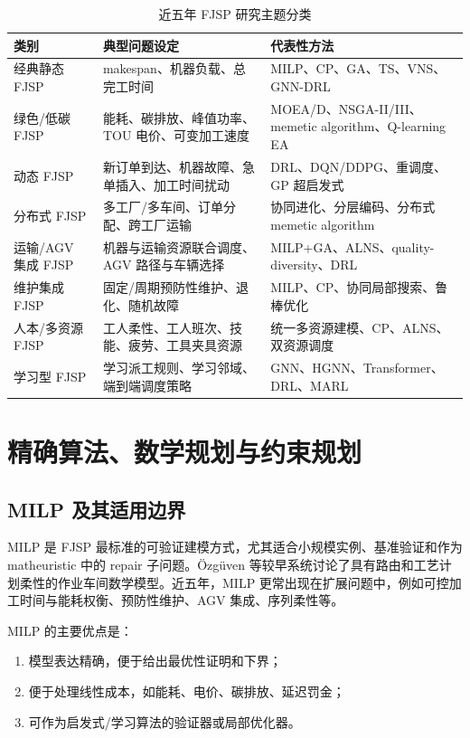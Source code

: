 \documentclass[UTF8,a4paper,11pt]{ctexart}
\begin{document}
\begin{table}[H]
\centering
\caption{近五年 FJSP 研究主题分类}
\label{tab:taxonomy}
\begin{tabularx}{\textwidth}{p{3.0cm}Y Y}
\toprule
类别 & 典型问题设定 & 代表性方法 \\
\midrule
经典静态 FJSP & makespan、机器负载、总完工时间 & MILP、CP、GA、TS、VNS、GNN-DRL \\
绿色/低碳 FJSP & 能耗、碳排放、峰值功率、TOU 电价、可变加工速度 & MOEA/D、NSGA-II/III、memetic algorithm、Q-learning EA \\
动态 FJSP & 新订单到达、机器故障、急单插入、加工时间扰动 & DRL、DQN/DDPG、重调度、GP 超启发式 \\
分布式 FJSP & 多工厂/多车间、订单分配、跨工厂运输 & 协同进化、分层编码、分布式 memetic algorithm \\
运输/AGV 集成 FJSP & 机器与运输资源联合调度、AGV 路径与车辆选择 & MILP+GA、ALNS、quality-diversity、DRL \\
维护集成 FJSP & 固定/周期预防性维护、退化、随机故障 & MILP、CP、协同局部搜索、鲁棒优化 \\
人本/多资源 FJSP & 工人柔性、工人班次、技能、疲劳、工具夹具资源 & 统一多资源建模、CP、ALNS、双资源调度 \\
学习型 FJSP & 学习派工规则、学习邻域、端到端调度策略 & GNN、HGNN、Transformer、DRL、MARL \\
\bottomrule
\end{tabularx}
\end{table}

\section{精确算法、数学规划与约束规划}

\subsection{MILP 及其适用边界}

MILP 是 FJSP 最标准的可验证建模方式，尤其适合小规模实例、基准验证和作为 matheuristic 中的 repair 子问题。Özgüven 等较早系统讨论了具有路由和工艺计划柔性的作业车间数学模型\cite{Ozgüven2010}。近五年，MILP 更常出现在扩展问题中，例如可控加工时间与能耗权衡\cite{Meng2023CPT}、预防性维护\cite{Zhao2025MILPPM}、AGV 集成\cite{Han2024AGV}、序列柔性\cite{Tang2024DFJSP}等。

MILP 的主要优点是：
\begin{enumerate}
    \item 模型表达精确，便于给出最优性证明和下界；
    \item 便于处理线性成本，如能耗、电价、碳排放、延迟罚金；
    \item 可作为启发式/学习算法的验证器或局部优化器。
\end{enumerate}
\end{document}
